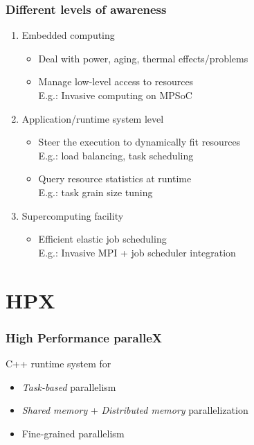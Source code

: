 \documentclass[compress]{beamer}
\begin{document}
\begin{frame}
	\frametitle{Different levels of awareness}
	\begin{enumerate}
		\item Embedded computing
		\begin{itemize}
			\item Deal with power, aging, thermal effects/problems
			\item Manage low-level access to resources\\
			E.g.: Invasive computing on MPSoC
		\end{itemize}
		\pause
		\item Application/runtime system level
		\begin{itemize}
			\item Steer the execution to dynamically fit resources\\
			E.g.: load balancing, task scheduling
			\item Query resource statistics at runtime\\
			E.g.: task grain size tuning
		\end{itemize}
		\pause
		\item Supercomputing facility
		\begin{itemize}
			\item Efficient elastic job scheduling\\
			E.g.: Invasive MPI + job scheduler integration
		\end{itemize}
	\end{enumerate}
\end{frame}

\section{HPX}
\begin{frame}
	\frametitle{High Performance paralleX}
	\pause
	C++ runtime system for
	\vspace{3mm}
	\begin{itemize}
		\item \emph{Task-based} parallelism
		\item \emph{Shared memory} + \emph{Distributed memory} parallelization
		\item Fine-grained parallelism
	\end{itemize}
\end{frame}
\end{document}
